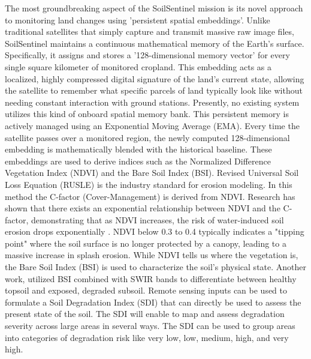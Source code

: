 \documentclass[11pt,letterpaper]{article}
\theoremstyle{plain}
\theoremstyle{definition}
\theoremstyle{remark}
\begin{document}
The most groundbreaking aspect of the SoilSentinel mission is its novel approach to monitoring land changes using 'persistent spatial embeddings'. Unlike traditional satellites that simply capture and transmit massive raw image files, SoilSentinel maintains a continuous mathematical memory of the Earth's surface. Specifically, it assigns and stores a '128-dimensional memory vector' for every single square kilometer of monitored cropland. This embedding acts as a localized, highly compressed digital signature of the land's current state, allowing the satellite to remember what specific parcels of land typically look like without needing constant interaction with ground stations. Presently, no existing system utilizes this kind of onboard spatial memory bank.
This persistent memory is actively managed using an Exponential Moving Average (EMA). Every time the satellite passes over a monitored region, the newly computed 128-dimensional embedding is mathematically blended with the historical baseline. These embeddings are used to derive indices such as the Normalized Difference Vegetation Index (NDVI) and the Bare Soil Index (BSI). Revised Universal Soil Loss Equation (RUSLE) is the industry standard for erosion modeling. In this method the C-factor (Cover-Management) is derived from NDVI. Research has shown that there exists an exponential relationship between NDVI and the C-factor, demonstrating that as NDVI increases, the risk of water-induced soil erosion drops exponentially \cite{van2000soil}. NDVI below 0.3 to 0.4 typically indicates a "tipping point" where the soil surface is no longer protected by a canopy, leading to a massive increase in splash erosion. While NDVI tells us where the vegetation is, the Bare Soil Index (BSI) is used to characterize the soil's physical state. Another work, \cite{diek2017barest} utilized BSI combined with SWIR bands to differentiate between healthy topsoil and exposed, degraded subsoil. Remote sensing inputs can be used to formulate a Soil Degradation Index (SDI) \cite{nascimento2021soil} that can directly be used to assess the present state of the soil. The SDI will enable to map and assess degradation severity across large areas in several ways. The SDI can be used to group areas into categories of degradation risk like very low, low, medium, high, and very high.
\end{document}
